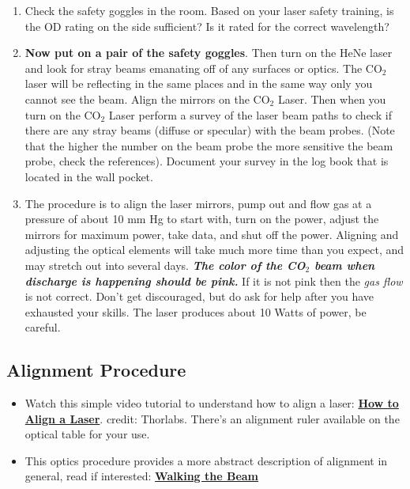 \documentclass{../lab}
\begin{document}
\begin{enumerate}
    \item Check the safety goggles in the room. Based on your laser safety training, is the OD rating on the side sufficient? Is it rated for the correct wavelength?
    \item \textbf{Now put on a pair of the safety goggles}. Then turn on the HeNe laser and look for stray beams emanating off of any surfaces or optics. The CO$_2$ laser will be reflecting in the same places and in the same way only you cannot see the beam. Align the mirrors on the CO$_2$ Laser. Then when you turn on the CO$_2$ Laser perform a survey of the laser beam paths to check if there are any stray beams (diffuse or specular) with the beam probes. (Note that the higher the number on the beam probe the more sensitive the beam probe, check the references). Document your survey in the log book that is located in the wall pocket.

    \item The procedure is to align the laser mirrors, pump out and flow gas at a pressure of about 10 mm Hg to start with, turn on the power, adjust the mirrors for maximum power, take data, and shut off the power. Aligning and adjusting the optical elements will take much more time than you expect, and may stretch out into several days.\emph{\textbf{ The color of the CO$_2$ beam when discharge is happening should be pink.}}  If it is not pink then the \emph{gas flow} is not correct. Don't get discouraged, but do ask for help after you have exhausted your skills. The laser produces about 10 Watts of power, be careful.
\end{enumerate}

\subsection{Alignment Procedure}

\begin{itemize}
    \item Watch this simple video tutorial to understand how to align a laser: \href{https://www.youtube.com/watch?v=qzxILY6nOmA}{\textbf{How to Align a Laser}}. credit: Thorlabs. There's an alignment ruler available on the optical table for your use.
    \item This optics procedure provides a more abstract description of alignment in general, read if interested: \href{https://drive.google.com/file/d/1LPv1VN-Z-flFoqicK-pz8oKmiB5DGtOi/view?usp=drive_link}{\textbf{Walking the Beam}}
\end{itemize}
\end{document}
